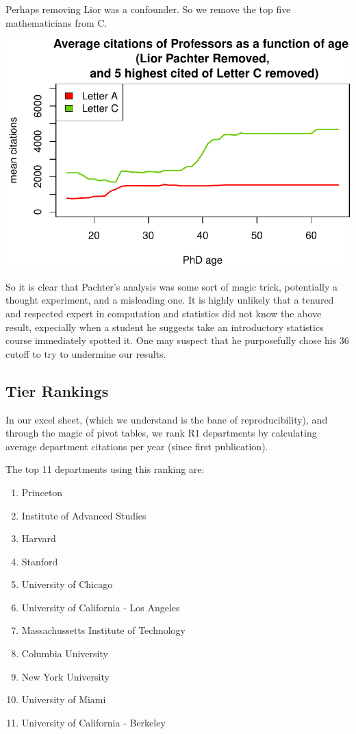\documentclass[]{article}
\begin{document}
Perhaps removing Lior was a confounder. So we remove the top five
mathematicians from C.

\includegraphics{index_files/figure-latex/unnamed-chunk-45-1.pdf}

So it is clear that Pachter's analysis was some sort of magic trick,
potentially a thought experiment, and a misleading one. It is highly
unlikely that a tenured and respected expert in computation and
statistics did not know the above result, expecially when a student he
suggests take an introductory statistics course immediately spotted it.
One may suspect that he purposefully chose his 36 cutoff to try to
undermine our results.

\hypertarget{tier-rankings}{%
\subsection{Tier Rankings}\label{tier-rankings}}

In our excel sheet, (which we understand is the bane of
reproducibility), and through the magic of pivot tables, we rank R1
departments by calculating average department citations per year (since
first publication).

The top 11 departments using this ranking are:

\begin{enumerate}
\def\labelenumi{\arabic{enumi}.}
\item
  Princeton
\item
  Institute of Advanced Studies
\item
  Harvard
\item
  Stanford
\item
  University of Chicago
\item
  University of California - Los Angeles
\item
  Massachussetts Institute of Technology
\item
  Columbia University
\item
  New York University
\item
  University of Miami
\item
  University of California - Berkeley
\end{enumerate}
\end{document}
